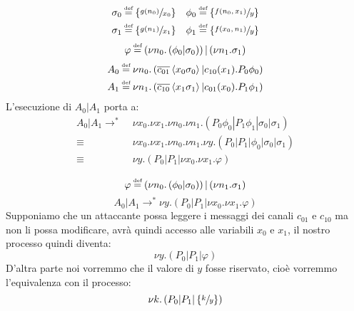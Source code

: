 \documentclass{beamer}
\theoremstyle{plain}
\theoremstyle{definition}
\theoremstyle{remark}
\newcommand{\obar}[1]{\overline{#1}}
\newcommand{\set}[1]{\left\{#1\right\}}
\newcommand{\pa}[1]{\left(#1\right)}
\newcommand{\ang}[1]{\left<#1\right>}
\newcommand*{\eqdef}{\ensuremath{\overset{\mathclap{\text{\tiny def}}}{=}}}
\begin{document}
\begin{frame}
    \begin{align*}
    \sigma _0 & \eqdef \set{\sfrac{g(n_0)}{x_0}} & \phi _0 & \eqdef
                                                             \set{\sfrac{
                                                             f(n_0,x_1)}{y}} \\
    \sigma _1 & \eqdef \set{\sfrac{g(n_1)}{x_1}} & \phi _1 & \eqdef
                                                             \set{\sfrac{
                                                             f(x_0,n_1)}{y}} 
  \end{align*}
  \[ \varphi \eqdef \pa{ \nu n_0.\pa{ \phi _0 | \sigma _0}} | \pa{ \nu
      n_1 . \sigma _1 } \]
  \begin{align*}
    A_0 &\eqdef \nu n_0.\pa{ \obar{c_{01}}\ang{x_0\sigma _0} |
          c_{10}(x_1).P_0\phi _0 } \\
    A_1 &\eqdef \nu n_1.\pa{ \obar{c_{10}}\ang{x_1\sigma _1} |
          c_{01}(x_0).P_1\phi _1 }
  \end{align*}
  L'esecuzione di $A_0|A_1$ porta a:
  \begin{align*}
    A_0 | A_1 \rightarrow ^* \;& \nu x_0.\nu x_1.\nu n_0.\nu
                            n_1.\pa{ P_0 \phi _0 | P_1 \phi _1 |
                            \sigma _0 | \sigma _1 } \\
     \equiv \; &\nu x_0.\nu x_1.\nu n_0.\nu n_1.\nu y.\pa{ P_0 | P_1 |
      \phi _0 | \sigma _0 | \sigma _1 } \\
    \equiv \; & \nu y.\pa{ P_0| P_1 | \nu x_0. \nu x_1. \varphi }
  \end{align*}
\end{frame}

\begin{frame}
  \[ \varphi \eqdef \pa{ \nu n_0.\pa{ \phi _0 | \sigma _0}} | \pa{ \nu
      n_1 . \sigma _1 } \]
  \[ A_0|A_1 \rightarrow ^* \nu y.\pa{ P_0| P_1 | \nu x_0. \nu x_1. \varphi } \]
  Supponiamo che un attaccante possa leggere i messaggi dei canali
  $c_{01}$ e $c_{10}$ ma non li possa modificare, avr\`a quindi
  accesso alle variabili $x_0$ e $x_1$, il nostro processo quindi
  diventa:
  \[ \nu y.\pa{ P_0| P_1 | \varphi } \]
  D'altra parte noi vorremmo che il valore di $y$ fosse riservato,
  cio\`e vorremmo l'equivalenza con il processo:
  \[ \nu k.\pa{P_0|P_1|\set{\sfrac{k}{y}}} \]
\end{frame}
\end{document}
